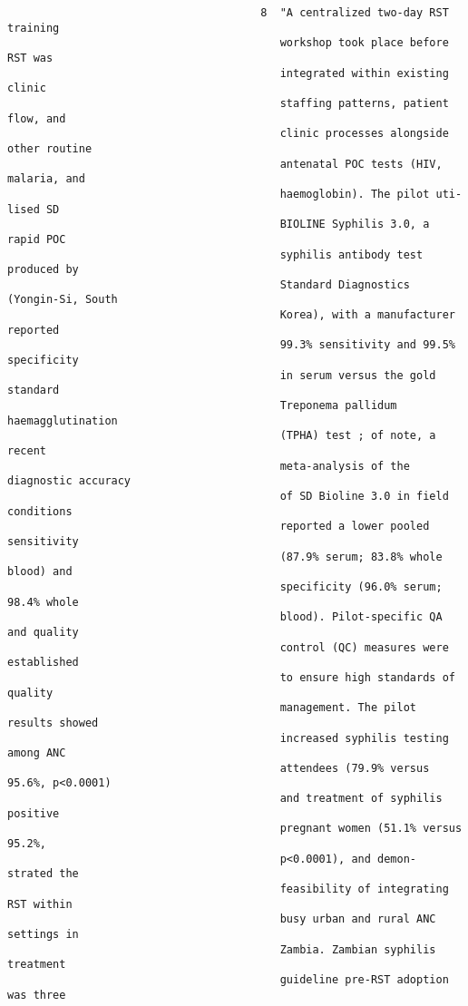 \documentclass{article}
\begin{document}
\begin{verbatim}
                                       8  "A centralized two-day RST training
                                          workshop took place before RST was
                                          integrated within existing clinic
                                          staffing patterns, patient flow, and
                                          clinic processes alongside other routine
                                          antenatal POC tests (HIV, malaria, and
                                          haemoglobin). The pilot uti- lised SD
                                          BIOLINE Syphilis 3.0, a rapid POC
                                          syphilis antibody test produced by
                                          Standard Diagnostics (Yongin-Si, South
                                          Korea), with a manufacturer reported
                                          99.3% sensitivity and 99.5% specificity
                                          in serum versus the gold standard
                                          Treponema pallidum haemagglutination
                                          (TPHA) test ; of note, a recent
                                          meta-analysis of the diagnostic accuracy
                                          of SD Bioline 3.0 in field conditions
                                          reported a lower pooled sensitivity
                                          (87.9% serum; 83.8% whole blood) and
                                          specificity (96.0% serum; 98.4% whole
                                          blood). Pilot-specific QA and quality
                                          control (QC) measures were established
                                          to ensure high standards of quality
                                          management. The pilot results showed
                                          increased syphilis testing among ANC
                                          attendees (79.9% versus 95.6%, p<0.0001)
                                          and treatment of syphilis positive
                                          pregnant women (51.1% versus 95.2%,
                                          p<0.0001), and demon- strated the
                                          feasibility of integrating RST within
                                          busy urban and rural ANC settings in
                                          Zambia. Zambian syphilis treatment
                                          guideline pre-RST adoption was three

\end{verbatim}
\end{document}
